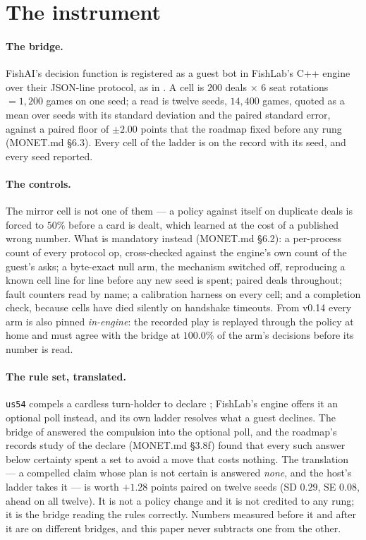 \documentclass[11pt]{article}
\newcommand{\code}[1]{\texttt{#1}}
\newcommand{\usff}{\code{us54}}
\newcommand{\monet}{MONET.md}
\begin{document}
\section{The instrument}
\label{sec:instrument}

\paragraph{The bridge.} FishAI's decision function is registered as a guest bot in FishLab's C++
engine over their JSON-line protocol, as in \cite{frontier}. A cell is $200$ deals $\times$ $6$
seat rotations $= 1{,}200$ games on one seed; a read is twelve seeds, $14{,}400$ games, quoted as a
mean over seeds with its standard deviation and the paired standard error, against a paired floor of
$\pm 2.00$ points that the roadmap fixed before any rung (\monet{} \S6.3). Every cell of the ladder
is on the record with its seed, and every seed reported.

\paragraph{The controls.} The mirror cell is not one of them --- a policy against itself on
duplicate deals is forced to $50\%$ before a card is dealt, which \cite{frontier} learned at the cost
of a published wrong number. What is mandatory instead (\monet{} \S6.2): a per-process count of
every protocol op, cross-checked against the engine's own count of the guest's asks; a byte-exact
null arm, the mechanism switched off, reproducing a known cell line for line before any new seed is
spent; paired deals throughout; fault counters read by name; a calibration harness on every cell;
and a completion check, because cells have died silently on handshake timeouts. From v0.14 every arm
is also pinned \emph{in-engine}: the recorded play is replayed through the policy at home and must
agree with the bridge at $100.0\%$ of the arm's decisions before its number is read.

\paragraph{The rule set, translated.} \usff{} compels a cardless turn-holder to declare
\cite{rules}; FishLab's engine offers it an optional poll instead, and its own ladder resolves what
a guest declines. The bridge of \cite{frontier} answered the compulsion into the optional poll, and
the roadmap's records study of the declare (\monet{} \S3.8f) found that every such answer below
certainty spent a set to avoid a move that costs nothing. The translation --- a compelled claim whose
plan is not certain is answered \emph{none}, and the host's ladder takes it --- is worth $+1.28$
points paired on twelve seeds (SD $0.29$, SE $0.08$, ahead on all twelve). It is not a policy change
and it is not credited to any rung; it is the bridge reading the rules correctly. Numbers measured
before it and after it are on different bridges, and this paper never subtracts one from the other.
\end{document}
